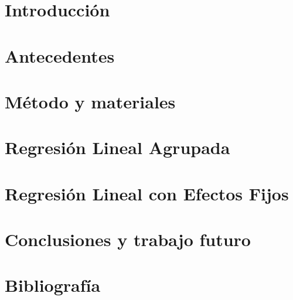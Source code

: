 \documentclass[11pt,a4paper,twoside]{tesis}
\begin{document}
\def\titulo{Licenciado }

\def\autor{Juan Manuel Pérez}
\def\tituloTesis{Mimetización entre interlocutores}
\def\runtitulo{Medición de la mimetización entre interlocutores utilizando series de tiempo}
\def\runtitle{Measuring entrainment between speakers using time series}
\def\director{Agustín Gravano}
\def\codirector{Ramiro Gálvez}
\def\lugar{Buenos Aires, 2015}


\frontmatter
\pagestyle{empty}




\listoftodos

\tableofcontents

\mainmatter
\pagestyle{headings}



\chapter{Introducción}



\chapter{Antecedentes}


\chapter{Método y materiales}


\chapter{Regresión Lineal Agrupada}


\chapter{Regresión Lineal con Efectos Fijos}


\chapter{Conclusiones y trabajo futuro}

\chapter{Bibliografía}
\backmatter



\end{document}
